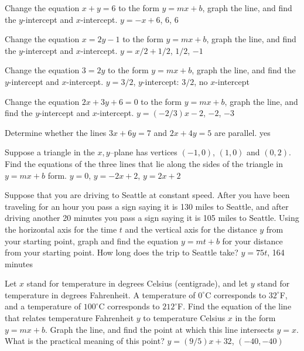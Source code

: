 \exercise Change the equation $x+y=6$ to the form $y=mx+b$, graph the
line, and find the $y$-intercept and $x$-intercept.
\answer $y=-x+6$, 6, 6
\endanswer

\endexercise

\exercise Change the equation $x=2y-1$ to the form $y=mx+b$, graph the
line, and find the $y$-intercept and $x$-intercept.
\answer $y=x/2+1/2$, $1/2$, $-1$
\endanswer
\endexercise

\exercise Change the equation $3=2y$ to the form $y=mx+b$, graph the
line, and find the $y$-intercept and $x$-intercept.
\answer $y=3/2$, $y$-intercept: $3/2$, no $x$-intercept
\endanswer

\endexercise

\exercise Change the equation $2x+3y+6=0$ to the form $y=mx+b$, graph the
line, and find the $y$-intercept and $x$-intercept.
\answer $y=(-2/3)x-2$, $-2$, $-3$
\endanswer
\endexercise

\exercise Determine whether the lines $3x+6y=7$ and $2x+4y=5$ are parallel.
\answer yes
\endanswer
\endexercise

\exercise Suppose a triangle in the $x,y$--plane has vertices $(-1,0)$,
$(1,0)$ and $(0,2)$.  Find the equations of the three lines that lie along
 the sides of the triangle in $y=mx+b$ form.
\answer $y=0$, $y=-2x+2$, $y=2x+2$
\endanswer
\endexercise

\exercise Suppose that you are driving to Seattle at constant speed.
After you have been traveling for an hour you pass a sign saying it is
130 miles to Seattle, and after driving another 20 minutes you pass a
sign saying it is 105 miles to Seattle.  Using the horizontal axis for
the time $t$ and the vertical axis for the distance $y$ from your
starting point, graph and find the equation $y=mt+b$ for your distance
from your starting point. How long does the trip to Seattle take?
\answer $y=75t$, 164 minutes
\endanswer

\endexercise

\exercise
Let $x$ stand for temperature in degrees Celsius (centigrade), and let
$y$ stand for temperature in degrees Fahrenheit.  A temperature of $0^\circ$C
corresponds to $32^\circ$F, and a temperature of
$100^\circ$C corresponds to $212^\circ$F.  Find the
equation of the line that relates temperature Fahrenheit $y$ to
temperature Celsius $x$ in the form $y=mx+b$.  
Graph the line, and find the point at which this line intersects $y=x$.
What is the practical meaning of this point?
\answer $y=(9/5)x+32$, $(-40,-40)$
\endanswer
\endexercise

